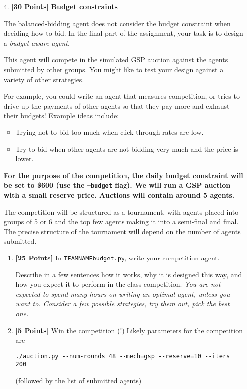 \documentclass[11pt]{article}
\newcommand{\points}[1]{\textbf{[#1 Points]}}
\begin{document}
\begin{enumerate}
		\item[4.] \points{30} {\bf Budget constraints}

                  The balanced-bidding agent does not consider the
                  budget constraint when deciding how to bid.  In the
                  final part of the assignment, your task is to design
                  a {\em budget-aware agent}.

                  This agent will compete in the simulated GSP auction
                  against the agents submitted by other groups. You
                  might like to test your design against a variety of
                  other strategies.

                  For example, you could write an agent that measures
                  competition, or
tries to drive up the payments of other
                  agents so that they pay more and exhaust their
budgets! Example ideas include:
%
\begin{itemize}
\item Trying not to bid too much when
click-through rates are low.
%
\item Try to bid when other agents are not bidding very much
and the price is lower.
%
\end{itemize}

{\bf For the purpose of the competition, the daily budget constraint
  will be set to \$600 (use the \texttt{--budget} flag). We will run a
  GSP auction with a small reserve price.  Auctions will contain
  around 5 agents.}

The competition will be structured as a tournament, with agents placed
into groups of 5 or 6 and the top few agents making it into a
semi-final and final. The precise structure of the tournament will
depend on the number of agents submitted.

		\begin{enumerate}
			\item \points{25} In \verb+TEAMNAMEbudget.py+, write your  competition agent.

Describe in a few sentences how it works, why
it is designed this way,
and how you expect it to perform in the class competition.
		 {\em You are not expected to spend many hours on writing an optimal  agent, unless you want to. Consider a few possible strategies, try them out, pick the best one.}

			\item \points{5} Win the competition (!)
		Likely parameters for the competition are
		
		\verb+./auction.py --num-rounds 48 --mech=gsp --reserve=10 --iters 200+

(followed by the list of submitted agents)

		\end{enumerate}			
	\end{enumerate}
\end{document}
